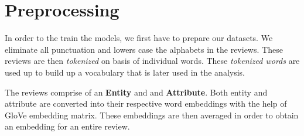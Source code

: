 \documentclass[comsoc,conference]{IEEEtran}
\begin{document}
\section{Preprocessing}



In order to the train the models, we first have to prepare our datasets. We eliminate all punctuation and lowers case the alphabets in the reviews. These reviews are then \textit{tokenized} on basis of individual words. These \textit{tokenized words} are used up to build up a vocabulary that is later used in the analysis.


The reviews comprise of an \textbf{Entity} and and \textbf{Attribute}. Both entity and attribute are converted into their respective word embeddings with the help of GloVe embedding matrix. These embeddings are then averaged in order to obtain an embedding for an entire review.
\end{document}
